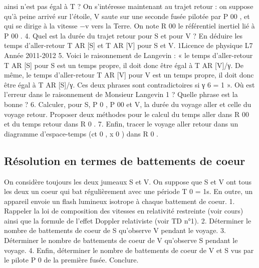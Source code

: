 ainsi n’est pas égal à T ?
On s’intéresse maintenant au trajet retour : on suppose qu’à peine arrivé sur l’étoile, V saute
sur une seconde fusée pilotée par P 00 , et qui se dirige à la vitesse −v vers la Terre. On note R 00
le référentiel inertiel lié à P 00 .
4. Quel est la durée du trajet retour pour S et pour V ? En déduire les temps d’aller-retour
T AR [S] et T AR [V] pour S et V.
1Licence de physique
L7
Année 2011-2012
5. Voici le raisonnement de Langevin : « le temps d’aller-retour T AR [S] pour S est un temps
propre, il doit donc être égal à T AR [V]/γ. De même, le temps d’aller-retour T AR [V] pour
V est un temps propre, il doit donc être égal à T AR [S]/γ. Ces deux phrases sont contradictoires si γ 6 = 1 ». Où est l’erreur dans le raisonnement de Monsieur Langevin 1 ? Quelle
phrase est la bonne ?
6. Calculer, pour S, P 0 , P 00 et V, la durée du voyage aller et celle du voyage retour. Proposer
deux méthodes pour le calcul du temps aller dans R 00 et du temps retour dans R 0 .
7. Enfin, tracer le voyage aller retour dans un diagramme d’espace-temps (ct 0 , x 0 ) dans R 0 .
\subsection{Résolution en termes de battements de coeur} %
On considère toujours les deux jumeaux S et V. On suppose que S et V ont tous les deux un
coeur qui bat régulièrement avec une période T 0 = 1s. En outre, un appareil envoie un flash
lumineux isotrope à chaque battement de coeur.
1. Rappeler la loi de composition des vitesses en relativité restreinte (voir cours) ainsi que la
formule de l’effet Doppler relativiste (voir TD n°1).
2. Déterminer le nombre de battements de coeur de S qu’observe V pendant le voyage.
3. Déterminer le nombre de battements de coeur de V qu’observe S pendant le voyage.
4. Enfin, déterminer le nombre de battements de coeur de V et S vus par le pilote P 0 de la
première fusée. Conclure.

